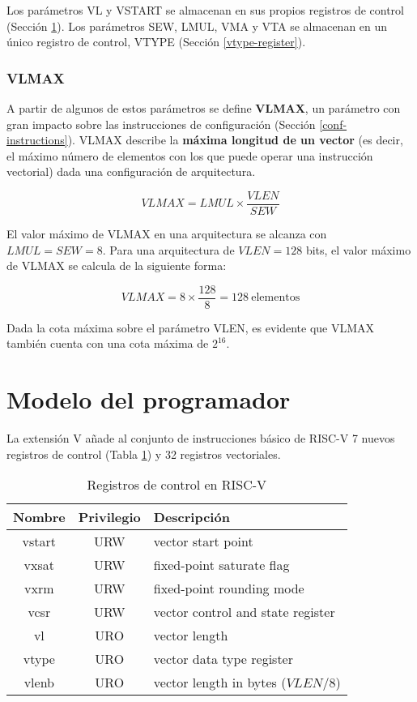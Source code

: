 Los parámetros VL y VSTART se almacenan en sus propios registros de control (Sección \ref{programmer-model}). Los parámetros SEW, LMUL, VMA y VTA se almacenan en un único registro de control, VTYPE (Sección \ref{vtype-register}).

\subsubsection{VLMAX}\label{vlmax}
A partir de algunos de estos parámetros se define \textbf{VLMAX}, un parámetro con gran impacto sobre las instrucciones de configuración (Sección \ref{conf-instructions}). VLMAX describe la \textbf{máxima longitud de un vector} (es decir, el máximo número de elementos con los que puede operar una instrucción vectorial) dada una configuración de arquitectura.

$$VLMAX = LMUL \times \frac{VLEN}{SEW}$$

El valor máximo de VLMAX en una arquitectura se alcanza con $LMUL = SEW = 8$. Para una arquitectura de $VLEN = 128$ bits, el valor máximo de VLMAX se calcula de la siguiente forma: 

$$VLMAX = 8 \times \frac{128}{8} = 128~\text{elementos}$$

Dada la cota máxima sobre el parámetro VLEN, es evidente que VLMAX también cuenta con una cota máxima de $2^{16}$.

\section{Modelo del programador}\label{programmer-model}
La extensión V añade al conjunto de instrucciones básico de RISC-V 7 nuevos registros de control (Tabla \ref{control-regs}) y 32 registros vectoriales.

\begin{table}[H]
    \begin{tabular}{@{}ccl@{}}
        \toprule 
        Nombre & Privilegio & \phantom{~~~~~~~~~~~~~~~~}Descripción\\
        \midrule 
        vstart & URW\footnotemark[1] & vector start point\\
        vxsat  & URW & fixed-point saturate flag\\
        vxrm   & URW & fixed-point rounding mode\\
        vcsr   & URW & vector control and state register\\
        vl     & URO\footnotemark[2] & vector length\\
        vtype  & URO & vector data type register\\
        vlenb  & URO & vector length in bytes ($VLEN / 8$)\\
        \bottomrule 
    \end{tabular}
    \caption{Registros de control en RISC-V}
    \label{control-regs}
\end{table}

